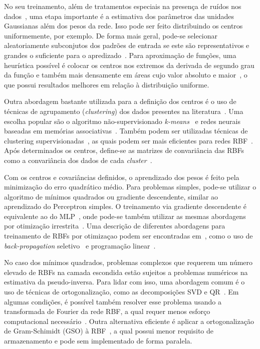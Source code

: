 \documentclass[conference]{IEEEtran}
\begin{document}
	No seu treinamento, além de tratamentos especiais na presença de ruídos nos dados~\cite{broomhead1988radial}, uma etapa importante é a estimativa dos parâmetros das unidades Gaussianas além dos pesos da rede. Isso pode ser feito distribuindo os centros uniformemente, por exemplo. De forma mais geral, pode-se selecionar aleatoriamente subconjutos dos padrões de entrada se este são representativos e grandes o suficiente para o apredizado~\cite{wu2012using}. Para aproximação de funções, uma heurística possível é colocar os centros nos extremos da derivada de segundo grau da função e também mais densamente em áreas cujo valor absoluto e maior~\cite{sanchez1995second}, o que possui resultados melhores em relação à distribuição uniforme.
	
	Outra abordagem bastante utilizada para a definição dos centros é o uso de técnicas de agrupamento (\textit{clustering}) dos dados presentes na literatura~\cite{du2006neural, du2010clustering}.  Uma escolha popular são o algoritmo não-supervisionado \textit{k-means}~\cite{moody1989fast} e redes neurais baseadas em memórias associativas~\cite{kohonen2012self}. Também podem ser utilizadas técnicas de clustering supervisionadas~\cite{chen1993hybrid}, as quais podem ser mais eficientes para redes RBF~\cite{wu2012using}. Após determinados os centros, define-se as matrizes de convariância das RBFs como a convariância dos dados de cada \textit{cluster}~\cite{wu2012using}. 
	
	Com os centros e covariâncias definidos, o aprendizado dos pesos é feito pela minimização do erro quadrático médio. Para problemas simples, pode-se utilizar o algoritmo de mínimos quadrados ou gradiente descendente, similar ao aprendizado do Perceptron simples. O treinamento via gradiente descendente é equivalente ao do MLP~\cite{wettschereck1992improving}, onde pode-se também utilizar as mesmas abordagens por otimização irrestrita~\cite{du2006neural}.	Uma descrição de diferentes abordagens para treinamento de RBFs por otimizaçao podem ser encontradas em~\cite{wu2012using}, como o uso de \textit{back-propagation} seletivo~\cite{vakil2004training} e programação linear~\cite{roy1995algorithm}.
	
	No caso dos mínimos quadrados, problemas complexos que requerem um número elevado de RBFs na camada escondida estão sujeitos a problemas numéricos na estimativa da pseudo-inversa. Para lidar com isso, uma abordagem comum é o uso de técnicas de ortogonalização, como as decomposições SVD e QR~\cite{golub1980analysis}. Em algumas condições, é possível também resolver esse problema usando a transformada de Fourier da rede RBF, a qual requer menos esforço computacional necessário~\cite{abe2003fast}. Outra alternativa eficiente é aplicar a ortogonalização de Gram-Schimidt (GSO) à RBF~\cite{kaminski1997kernel}, a qual possui menor requisito de armazenamento e pode sem implementado de forma paralela.
	
\end{document}
